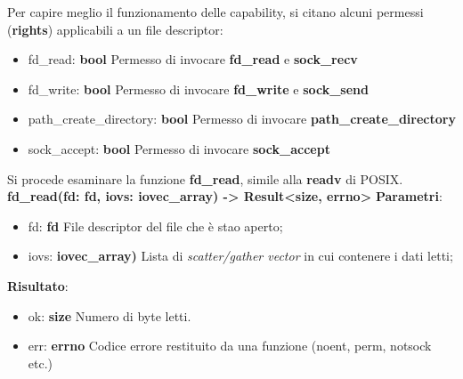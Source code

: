 Per capire meglio il funzionamento delle capability, si citano alcuni permessi (\textbf{rights}) applicabili a un file descriptor:
\begin{itemize}
        \item fd\_read: \textbf{bool} Permesso di invocare \textbf{fd\_read} e \textbf{sock\_recv}
        \item fd\_write: \textbf{bool} Permesso di invocare \textbf{fd\_write} e \textbf{sock\_send}
        \item path\_create\_directory: \textbf{bool} Permesso di invocare \textbf{path\_create\_directory}
        \item sock\_accept: \textbf{bool} Permesso di invocare \textbf{sock\_accept} 
\end{itemize}
Si procede esaminare la funzione \textbf{fd\_read}, simile alla \textbf{readv} di POSIX.
\textbf{fd\_read(fd: fd, iovs: iovec\_array) -> Result<size, errno>}
\textbf{Parametri}:
\begin{itemize}
        \item fd: \textbf{fd} File descriptor del file che è stao aperto;
        \item iovs: \textbf{iovec\_array)} Lista di \emph{scatter/gather vector} in cui contenere i dati letti;
\end{itemize}
\textbf{Risultato}:
\begin{itemize}
        \item ok: \textbf{size} Numero di byte letti.
        \item err: \textbf{errno} Codice errore restituito da una funzione (noent, perm, notsock etc.)
\end{itemize}
